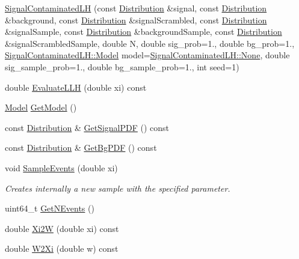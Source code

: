 \begin{DoxyCompactItemize}
\item 
\hyperlink{classSignalContaminatedLH_adcc85279f2683e800839bf9b1d837a53}{Signal\-Contaminated\-L\-H} (const \hyperlink{classDistribution}{Distribution} \&signal, const \hyperlink{classDistribution}{Distribution} \&background, const \hyperlink{classDistribution}{Distribution} \&signal\-Scrambled, const \hyperlink{classDistribution}{Distribution} \&signal\-Sample, const \hyperlink{classDistribution}{Distribution} \&background\-Sample, const \hyperlink{classDistribution}{Distribution} \&signal\-Scrambled\-Sample, double N, double sig\-\_\-prob=1., double bg\-\_\-prob=1., \hyperlink{classSignalContaminatedLH_a9d4a8fe949ffa894ce3dc79a79257c39}{Signal\-Contaminated\-L\-H\-::\-Model} model=\hyperlink{classSignalContaminatedLH_a9d4a8fe949ffa894ce3dc79a79257c39a938925ccf594ff61ad6259e1cbad39ad}{Signal\-Contaminated\-L\-H\-::\-None}, double sig\-\_\-sample\-\_\-prob=1., double bg\-\_\-sample\-\_\-prob=1., int seed=1)
\item 
double \hyperlink{classSignalContaminatedLH_a30c729fa905cc0d812827f23c71b55cc}{Evaluate\-L\-L\-H} (double xi) const 
\item 
\hyperlink{classSignalContaminatedLH_a9d4a8fe949ffa894ce3dc79a79257c39}{Model} \hyperlink{classSignalContaminatedLH_a07dbde7a99bf6b3063a933f2a53f48a1}{Get\-Model} ()
\item 
const \hyperlink{classDistribution}{Distribution} \& \hyperlink{classSignalContaminatedLH_a4172a3ca2e8261150d5008886342529f}{Get\-Signal\-P\-D\-F} () const 
\item 
const \hyperlink{classDistribution}{Distribution} \& \hyperlink{classSignalContaminatedLH_a6c6990779ac1e9b26eb1468944109760}{Get\-Bg\-P\-D\-F} () const 
\item 
void \hyperlink{classSignalContaminatedLH_a04fcf69547f8b0c5bc3ee2cb89671c06}{Sample\-Events} (double xi)
\begin{DoxyCompactList}\small\item\em Creates internally a new sample with the specified parameter. \end{DoxyCompactList}\item 
uint64\-\_\-t \hyperlink{classSignalContaminatedLH_abc5929f588d9e1944010e303ce66abf7}{Get\-N\-Events} ()
\item 
double \hyperlink{classSignalContaminatedLH_a9e201ec323c7d849151bde4b0d0ac82a}{Xi2\-W} (double xi) const 
\item 
double \hyperlink{classSignalContaminatedLH_ad39354a351421539c3e7fd136398b7b5}{W2\-Xi} (double w) const 

\end{DoxyCompactItemize}
